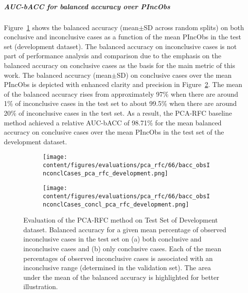 \subparagraph{AUC-bACC for balanced accuracy over PIncObs}

Figure~\ref{fig:bacc_obsInconclCases_pca_rfc_development} shows the balanced accuracy (mean$\pm$SD across random splits) 
on both conclusive and inconclusive cases as a function of the mean PIncObs
in the test set (development dataset).
The balanced accuracy on inconclusive cases is not part of performance analysis and comparison 
due to the emphasis on the balanced accuracy on conclusive cases as the basis for the main metric of this work.
The balanced accuracy (mean$\pm$SD) on conclusive cases over the mean PIncObs
is depicted with enhanced clarity and precision in Figure~\ref{fig:bacc_obsInconclCases_concl_pca_rfc_development}.
The mean of the balanced accuracy rises from approximately 97\% 
when there are around 1\% of inconclusive cases in the test set to about 99.5\% 
when there are around 20\% of inconclusive cases in the test set.
As a result, the PCA-RFC baseline method achieved a relative AUC-bACC of 98.71\% for the mean balanced accuracy on conclusive cases
over the mean PIncObs in the test set of the development dataset.


\begin{figure}[ht]
  \begin{subfigure}{0.5\textwidth}
    \centering
    \texttt{[image: content/figures/evaluations/pca\_rfc/66/bacc\_obsInconclCases\_pca\_rfc\_development.png]}
    \subcaption{}
    \label{fig:bacc_obsInconclCases_pca_rfc_development}
  \end{subfigure}
  \hfill
  \begin{subfigure}{0.5\textwidth}
    \centering
    \texttt{[image: content/figures/evaluations/pca\_rfc/66/bacc\_obsInconclCases\_concl\_pca\_rfc\_development.png]}
    \subcaption{}
    \label{fig:bacc_obsInconclCases_concl_pca_rfc_development}
  \end{subfigure}

  \caption{Evaluation of the PCA-RFC method on Test Set of Development dataset.
  Balanced accuracy for a given mean percentage of observed inconclusive cases in the test set on 
  (a) both conclusive and inconclusive cases and (b) only conclusive cases. 
  Each of the mean percentages of observed inconclusive cases is associated with an inconclusive range (determined in the validation set). 
  The area under the mean of the balanced accuracy is highlighted for better illustration.}
  \label{fig:bacc_obsInconclCases_pca_rfc_development_full}
\end{figure}

